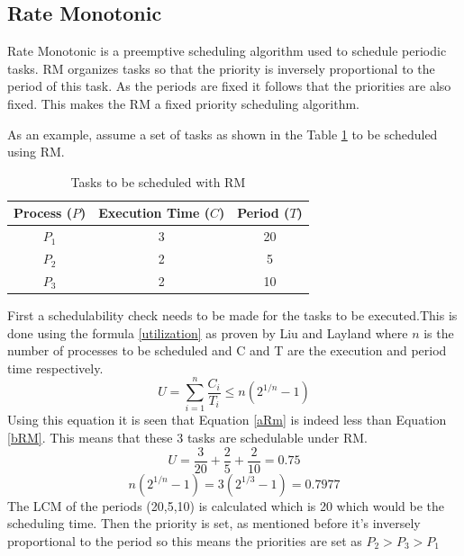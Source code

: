 \documentclass[conference]{IEEEtran}
\begin{document}
\subsection{Rate Monotonic}
Rate Monotonic is a preemptive scheduling algorithm used to schedule periodic tasks. RM organizes tasks so that the priority is inversely proportional to the period of this task. As the periods are fixed it follows that the priorities are also fixed. This makes the RM a fixed priority scheduling algorithm.

As an example, assume a set of tasks as shown in the Table \ref{tab:RMtaskstable} to be scheduled using RM.
\begin{table}[h]
    \centering
    \begin{tabular}{ |c|c|c| } 
    \hline
        Process ($P$) & Execution Time ($C$) & Period ($T$)\\
        \hline\hline
         ${P_1}$& 3 & 20 \\
         \hline
         ${P_2}$& 2 & 5 \\
         \hline
         ${P_3}$& 2 & 10 \\
         \hline
         
    \end{tabular}
    \vspace{1em}
    \caption{Tasks to be scheduled with RM}
    \label{tab:RMtaskstable}
\end{table}
First a schedulability check needs to be made for the tasks to be executed.This is done using the formula \ref{utilization} as proven by Liu and Layland \cite{schedulingformula} where $n$ is the number of processes to be scheduled and C and T are the execution and period time respectively.
\begin{equation}
    {U}={{\sum^{n}_{i=1}}} \frac{C_i}{T_i} \leq n(2^{1/n}-1)
    \label{utilization}
\end{equation}
Using this equation it is seen that Equation \ref{aRm} is indeed less than Equation \ref{bRM}. This means that these 3 tasks are schedulable under RM.
\begin{equation}
    U=\frac{3}{20}+\frac{2}{5}+\frac{2}{10}=0.75
    \label{aRm}
\end{equation}
\begin{equation}
    n(2^{1/n}-1)=3( 2^{1/3} - 1) = 0.7977
    \label{bRM}
\end{equation}
The LCM of the periods (20,5,10) is calculated which is 20 which would be the scheduling time. Then the priority is set, as mentioned before it's inversely proportional to the period so this means the priorities are set as \(P_2 > P_3 > P_1\)
\end{document}
